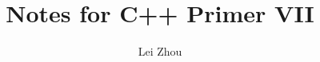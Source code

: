 \documentclass{article}
\begin{document}
\title{Notes for C++ Primer VII}
\author{Lei Zhou}
\maketitle



%

%

%

%

%

%
\end{document}

